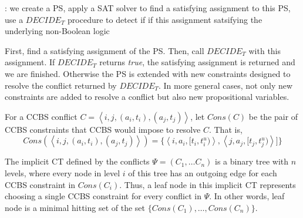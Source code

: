 \documentclass[review]{elsarticle}
\newcommand{\tuple}[1]{\ensuremath{\left \langle #1 \right \rangle }}
\newcommand{\decidet}{\ensuremath{\mathit{DECIDE_T}}\xspace}
\newcommand{\ccbs}{\ac{CCBS}\xspace}
\newcommand{\ct}{\ac{CT}\xspace}
\newcommand{\ps}{\ac{PS}\xspace}
\newcommand{\mapfr}{\ac{MAPF}$_R$\xspace}
\newcommand{\true}{\textit{true}\xspace}
\begin{document}
: we create a \ps, apply a SAT solver to find a satisfying assignment to this \ps, use a \decidet procedure to detect if  if this assignment satsifying the underlying non-Boolean logic 

 First, find a satisfying assignment of the \ps. 
Then, call \decidet with this assignment. If \decidet returns \true, the satisfying assignment is returned and we are finished. 
Otherwise the \ps is extended with new constraints designed to resolve the conflict returned by \decidet. 
In more general cases, not only new constraints are added to resolve a conflict but also new propositional variables.



For a \ccbs conflict $C=\tuple{i,j, (a_i, t_i), (a_j, t_j)}$, 
let $Cons(C)$ be the pair of \ccbs constraints that \ccbs would impose to resolve $C$. 
That is, 
\begin{equation}
Cons(\tuple{i,j, (a_i, t_i), (a_j, t_j)})=\{ \tuple{i,a_i, [t_i,t_i^u)}, \tuple{j,a_j, [t_j,t_j^u)}] \}
\end{equation}




The implicit \ct defined by the conflicts $\Psi=(C_1,\ldots C_n)$ 
is a binary tree with $n$ levels, where every node in level $i$ of this tree
has an outgoing edge for each \ccbs constraint in $Cons(C_i)$. 
Thus, a leaf node in this implicit \ct represents choosing a single \ccbs constraint for every conflict in $\Psi$. In other words, leaf node is a minimal hitting set of the set $\{Cons(C_1),\ldots,Cons(C_n)\}$. 
\end{document}
